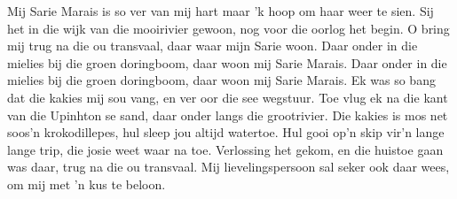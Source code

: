 \beginverse*
Mij Sarie Marais is so ver van mij hart
maar 'k hoop om haar weer te sien.
Sij het in die wijk van die mooirivier gewoon,
nog voor die oorlog het begin.
\endverse
\beginchorus
O bring mij trug na die ou transvaal,
daar waar mijn Sarie woon.
Daar onder in die mielies bij die groen doringboom,
daar woon mij Sarie Marais.
Daar onder in die mielies bij die groen doringboom,
daar woon mij Sarie Marais.
\endchorus
\beginverse*
Ek was so bang dat die kakies mij sou vang,
en ver oor die see wegstuur.
Toe vlug ek na die kant van die Upinhton se sand,
daar onder langs die grootrivier.
\endverse
\beginverse*
Die kakies is mos net soos’n krokodillepes,
hul sleep jou altijd watertoe.
Hul gooi op’n skip vir’n lange lange trip,
die josie weet waar na toe.
\endverse
\beginverse*
Verlossing het gekom, en die huistoe gaan was daar,
trug na die ou transvaal.
Mij lievelingspersoon sal seker ook daar wees,
om mij met 'n kus te beloon.
\endverse
\endsong
